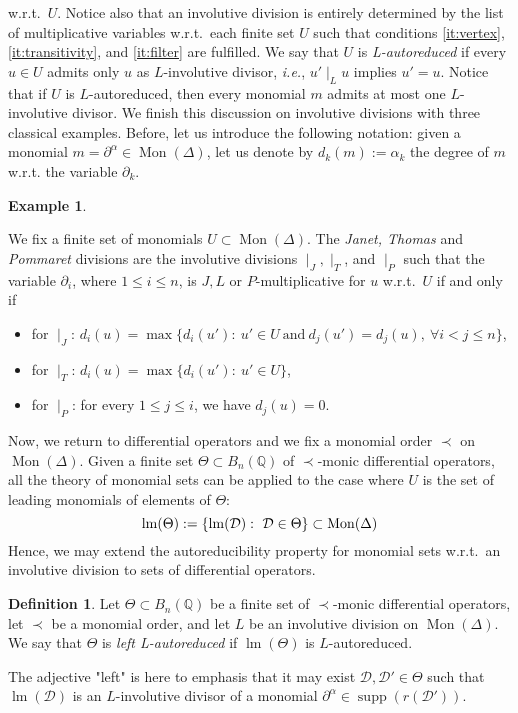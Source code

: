 \documentclass[11pt]{article}
\theoremstyle{definition}
\newtheorem{definition}[theorem]{Definition}
\newtheorem{example}[theorem]{Example}
\newcommand\ie{\emph{i.e.}}
\newcommand\D{\mathcal{D}}
\DeclareMathOperator{\supp}{supp}
\DeclareMathOperator{\lm}{lm}
\newcommand\Q{\mathbb{Q}}
\newcommand\Weyl[1]{B_{#1}(\Q)}
\newcommand\monBasis{\Mon(\Delta)}
\DeclareMathOperator{\Mon}{Mon}
\newcommand\divInv[1]{\mid_{#1}}
\begin{document}
w.r.t.\ $U$. Notice also that an involutive division is entirely
determined by the list of multiplicative variables w.r.t.\ each finite
set $U$ such that conditions \ref{it:vertex}, \ref{it:transitivity}, and
\ref{it:filter} are fulfilled. We say that $U$ is {\em L-autoreduced} if
every $u\in U$ admits only $u$ as $L$-involutive divisor, \ie,
$u'\divInv{L}u$ implies $u'=u$. Notice that if $U$ is $L$-autoreduced,
then every monomial $m$ admits at most one $L$-involutive divisor. We
finish this discussion on involutive divisions with three classical
examples. Before, let us introduce the following notation: given a
monomial $m=\partial^\alpha\in\monBasis$, let us denote by
$d_k(m):=\alpha_k$ the degree of $m$ w.r.t. the variable $\partial_k$.
\smallskip

\begin{example}\label{ex:involutive_division}

  We fix a finite set of monomials $U\subset\monBasis$. The
  {\em Janet, Thomas} and {\em Pommaret} divisions are the involutive
  divisions $\divInv{J},\divInv{T}$, and $\divInv{P}$ such that the
  variable $\partial_i$, where $1\leq i\leq n$, is
  $J,L$ or $P$-multiplicative for $u$ w.r.t.\ $U$ if and only if 
  \begin{itemize}
  \item for $\divInv{J}$: $d_i(u)=\max\{d_i(u'):\ u'\in U\ \text{and}\
    d_j(u')=d_j(u),\ \forall i<j\leq n\}$, 
  \item for $\divInv{T}$: $d_i(u)=\max\{d_i(u'):\ u'\in U\}$,
  \item for $\divInv{P}$: for every $1\leq j\leq i$, we have $d_j(u)=0$.
  \end{itemize}

  
\end{example}
\smallskip

Now, we return to differential operators and we fix a monomial order
$\prec$ on $\monBasis$. Given a finite set $\Theta\subset\Weyl{n}$ of
$\prec$-monic differential operators, all the theory of monomial sets can
be applied to the case where $U$ is the set of leading monomials of
elements of $\Theta$:
\[\lm(\Theta):=\left\{\lm(\D):\ \D\in\Theta\right\}\subset\monBasis
\smallskip\]
Hence, we may extend the autoreducibility property for monomial sets
w.r.t.\ an involutive division to sets of differential operators.
\smallskip

\begin{definition}
  Let $\Theta\subset\Weyl{n}$ be a finite set of $\prec$-monic
  differential operators, let $\prec$ be a monomial order, and let $L$ be
  an involutive division on $\Mon(\Delta)$. We say that $\Theta$ is
  {\em left L-autoreduced} if $\lm(\Theta)$ is $L$-autoreduced.
\end{definition}
\smallskip
\noindent
The adjective "left" is here to emphasis that it may exist
$\D,\D'\in\Theta$ such that $\lm(\D)$ is an $L$-involutive divisor of a
monomial $\partial^\alpha\in\supp(r(\D'))$.
\medskip
\end{document}
